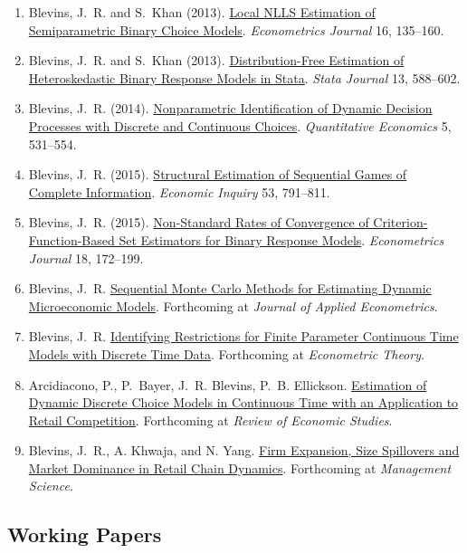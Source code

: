 \documentclass[10pt,letterpaper]{article}
\begin{document}
\begin{enumerate}
\item Blevins, J.~R. and S.~Khan (2013).
  \href{http://jblevins.org/research/lnlls}{Local NLLS Estimation of Semiparametric Binary Choice Models}.
  \textit{Econometrics Journal} 16, 135--160.
\item Blevins, J.~R. and S.~Khan (2013).
  \href{http://jblevins.org/research/dfbr/}{Distribution-Free Estimation of Heteroskedastic Binary Response Models in Stata}.
  \textit{Stata Journal} 13, 588--602.
\item Blevins, J.~R. (2014).
  \href{http://jblevins.org/research/dcident}{Nonparametric Identification of Dynamic Decision Processes with Discrete and Continuous Choices}.
  \textit{Quantitative Economics} 5, 531--554.
\item Blevins, J.~R. (2015).
  \href{http://jblevins.org/research/seqgame}{Structural Estimation of Sequential Games of Complete Information}.
  \textit{Economic Inquiry} 53, 791--811.
\item Blevins, J.~R. (2015).
  \href{http://jblevins.org/research/cuberoot}{Non-Standard Rates of Convergence of Criterion-Function-Based Set Estimators for Binary Response Models}.
  \textit{Econometrics Journal} 18, 172--199.
\item Blevins, J.~R.
  \href{http://jblevins.org/research/smcdmm}{Sequential Monte Carlo Methods for Estimating Dynamic Microeconomic Models}.
  Forthcoming at \textit{Journal of Applied Econometrics}.
\item Blevins, J.~R.
  \href{http://jblevins.org/research/sde}{Identifying Restrictions for Finite Parameter Continuous Time Models with Discrete Time Data}.
  Forthcoming at \textit{Econometric Theory}.
\item Arcidiacono, P., P.~Bayer, J.~R. Blevins, P.~B. Ellickson.
  \href{http://jblevins.org/research/abbe}{Estimation of Dynamic Discrete Choice Models in Continuous Time with an Application to Retail Competition}.
  Forthcoming at \textit{Review of Economic Studies}.
\item Blevins, J.~R., A. Khwaja, and N. Yang.
  \href{http://jblevins.org/research/bky}{Firm Expansion, Size Spillovers and Market Dominance in Retail Chain Dynamics}.
  Forthcoming at \textit{Management Science}.
\end{enumerate}

\subsection*{Working Papers}
\end{document}
